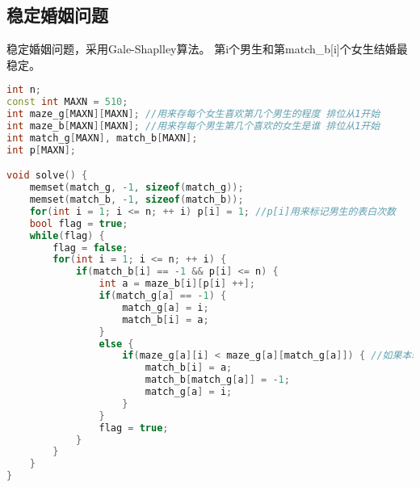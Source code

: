 \subsection{稳定婚姻问题}
稳定婚姻问题，采用Gale-Shaplley算法。
第i个男生和第match_b[i]个女生结婚最稳定。
    \begin{lstlisting}[language=c++]
int n;
const int MAXN = 510;
int maze_g[MAXN][MAXN]; //用来存每个女生喜欢第几个男生的程度 排位从1开始
int maze_b[MAXN][MAXN]; //用来存每个男生第几个喜欢的女生是谁 排位从1开始
int match_g[MAXN], match_b[MAXN];
int p[MAXN];

void solve() {
    memset(match_g, -1, sizeof(match_g));
    memset(match_b, -1, sizeof(match_b));
    for(int i = 1; i <= n; ++ i) p[i] = 1; //p[i]用来标记男生的表白次数
    bool flag = true;
    while(flag) {
        flag = false;
        for(int i = 1; i <= n; ++ i) {
            if(match_b[i] == -1 && p[i] <= n) {
                int a = maze_b[i][p[i] ++];
                if(match_g[a] == -1) {
                    match_g[a] = i;
                    match_b[i] = a;
                }
                else {
                    if(maze_g[a][i] < maze_g[a][match_g[a]]) { //如果本轮男生更优秀则选择本轮男生
                        match_b[i] = a;
                        match_b[match_g[a]] = -1;
                        match_g[a] = i;
                    }
                }
                flag = true;
            }
        }
    }
}
    \end{lstlisting}
